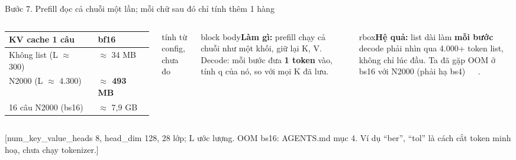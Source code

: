 \documentclass[aspectratio=169,xcolor=table]{beamer}
\newcommand{\bad}[1]{\textcolor{RiskRed}{\textbf{#1}}}
\newcommand{\src}[1]{\par\vfill{\tiny\color{TextGray}[#1]}}
\newcommand{\bsz}{\footnotesize}%
\newcommand{\nbox}[2][block body]{\begin{beamercolorbox}[sep=0.45em,rounded=true]{#1}\bsz #2\end{beamercolorbox}}
\newcommand{\tagbox}[2]{{\scriptsize\colorbox{#1}{\textcolor{white}{\textbf{#2}}}}}
\newcommand{\DO}{\tagbox{GoodGreen}{đo}}
\newcommand{\TA}{\tagbox{TextGray}{ta}}
\begin{document}
\begin{frame}{Bước 7. Prefill đọc cả chuỗi một lần; mỗi chữ sau đó chỉ tính thêm 1 hàng}
\begin{columns}[T]
\renewcommand{\arraystretch}{1.05}\scriptsize
\begin{tabular}{L{2.55cm}R{1.25cm}}
\toprule
KV cache 1 câu & bf16 \\
\midrule
Không list (L $\approx$ 300) & $\approx$ 34 MB \\
N2000 (L $\approx$ 4.300) & \bad{$\approx$ 493 MB} \\
16 câu N2000 (bs16) & $\approx$ 7,9 GB \\
\bottomrule
\end{tabular}\par
{\tiny\color{TextGray} tính từ config, chưa đo \TA}
\nbox{\textbf{Làm gì:} prefill chạy cả chuỗi như một khối, giữ lại K, V. Decode: mỗi bước đưa \textbf{1 token} vào, tính q của nó, so với mọi K đã lưu.}
\nbox[rbox]{\textbf{Hệ quả:} list dài làm \textbf{mỗi bước} decode phải nhìn qua 4.000+ token list, không chỉ lúc đầu. Ta đã gặp OOM ở bs16 với N2000 (phải hạ bs4) \DO.}
\end{columns}
\src{num\_key\_value\_heads 8, head\_dim 128, 28 lớp; L ước lượng. OOM bs16: AGENTS.md mục 4. Ví dụ ``ber'', ``tol'' là cách cắt token minh hoạ, chưa chạy tokenizer.}
\end{frame}
\end{document}
